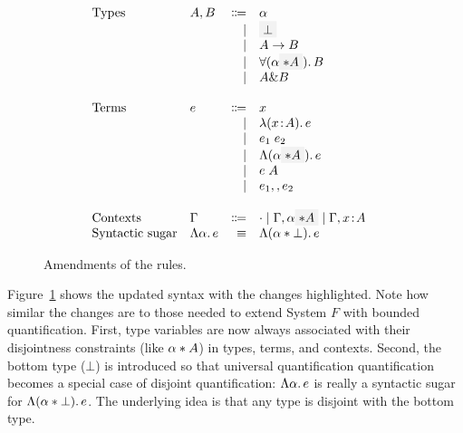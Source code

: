 \begin{figure}
  \[
    \begin{array}{l}
      \begin{array}{llrll}
        \text{Types}
        & A, B & \Coloneqq & \alpha                  & \\
        &      & \mid & \highlight {$\bot$}          & \\
        &      & \mid & A \to B                      & \\
        &      & \mid & \for {(\alpha \highlight {$\disjoint A$})} B  & \\
        &      & \mid & A \inter B                   & \\

        \\
        \text{Terms}
        & e & \Coloneqq & x                        & \\
        &   & \mid & \lam {(x \oftype A)} e          & \\
        &   & \mid & \app {e_1} {e_2}              & \\
        &   & \mid & \blam {(\alpha \highlight {$\disjoint A$})} e  & \\
        &   & \mid & \tapp e A                     & \\
        &   & \mid & e_1 \mergeop e_2              & \\

        \\
        \text{Contexts}
        & \Gamma & \Coloneqq & \cdot
                   \mid \Gamma, \alpha \highlight {$\disjoint A$}
                   \mid \Gamma, x \oftype A  & \\

        \text{Syntactic sugar} & \blam \alpha e & \equiv & \blamdis \alpha \bot e & \\
      \end{array}
    \end{array}
  \]

  \caption{Amendments of the rules.}
  \label{fig:fi-syntax-dis}
\end{figure}

Figure~\ref{fig:fi-syntax-dis} shows the updated syntax with the changes highlighted.
Note how similar the changes are to those needed to extend System $F$ with
bounded quantification. First, type variables are now always associated with
their disjointness constraints (like $\alpha * A$) in types, terms, and
contexts. Second, the bottom type ($\bot$) is introduced so that universal quantification
quantification becomes a special case of disjoint
quantification: $\Lambda \alpha.\, e$ is really a syntactic sugar for $\Lambda (\alpha * \bot).\, e$. The underlying idea is that any type is disjoint
with the bottom type.

